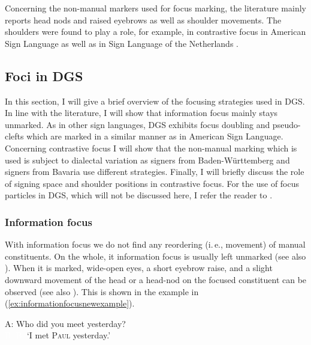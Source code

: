 Concerning the non-manual markers used for focus marking, the literature mainly reports head nods and raised eyebrows  as well as shoulder movements. The shoulders were found to play a role, for example, in contrastive focus in American Sign Language \citep{wilbur1999syntactic} as well as in Sign Language of the Netherlands \citep{crasborn2013phonology}.

\subsection{Foci in DGS}
In this section, I will give a brief overview of the focusing strategies used in DGS. In line with the literature, I will show that information focus mainly stays unmarked. As in other sign languages, DGS exhibits focus doubling and pseudo-clefts which are marked in a similar manner as in American Sign Language. Concerning contrastive focus I will show that the non-manual marking which is used is subject to dialectal variation as signers from Baden-Württemberg and signers from Bavaria use different strategies. Finally, I will briefly discuss the role of signing space and shoulder positions in contrastive focus. For the use of focus particles in DGS, which will not be discussed here, I refer the reader to \citet{herrmann2013modal}.

\subsubsection{Information focus}
With information focus we do not find any reordering (i.\,e., movement) of manual constituents. On the whole, it information focus is usually left unmarked (see also \citealt{waleschkowski2009}). When it is marked, wide-open eyes, a short eyebrow raise, and a slight downward movement of the head or a head-nod on the focused constituent can be observed (see also \citealt[396]{happ2014vork}). This is shown in the example in (\ref{ex:informationfocusnewexample}).

\begin{exe}
\ex\label{ex:informationfocusnewexample}
A: Who did you meet yesterday?\\
\textcolor{white}{B: }  
\glt \textcolor{white}{B: }`I met \textsc{Paul} yesterday.' 
\end{exe}

